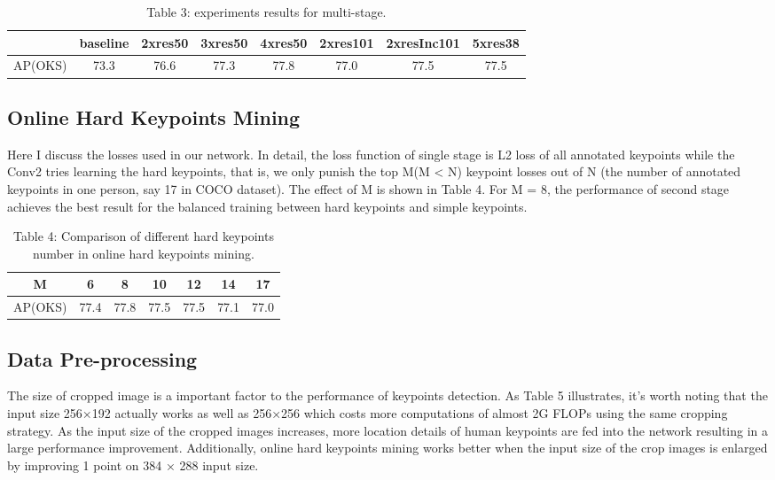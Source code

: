 \captionsetup[table]{labelformat=empty}
\begin{table}[!hbp]
  \centering
  \begin{tabular}{|c|c|c|c|c|c|c|c|}
  \hline
            & baseline & 2xres50 & 3xres50 & 4xres50 & 2xres101 & 2xresInc101 & 5xres38 \\
  \hline
  AP(OKS) & 73.3 & 76.6 & 77.3 & 77.8 & 77.0 & 77.5 & 77.5 \\
  \hline
  \end{tabular}
  \caption{Table 3: experiments results for multi-stage.}
\end{table}

\subsection{Online Hard Keypoints Mining}
Here I discuss the losses used in our network. In detail,
the loss function of single stage is L2 loss of all annotated
keypoints while the Conv2 tries learning the hard keypoints,
that is, we only punish the top M(M < N) keypoint
losses out of N (the number of annotated keypoints in one
person, say 17 in COCO dataset). The effect of M is shown
in Table 4. For M = 8, the performance of second stage
achieves the best result for the balanced training between
hard keypoints and simple keypoints.

\captionsetup[table]{labelformat=empty}
\begin{table}[!hbp]
  \centering
  \begin{tabular}{|c|c|c|c|c|c|c|}
  \hline
  M          & 6 & 8 & 10 & 12 & 14 & 17 \\
  \hline
  AP(OKS) & 77.4 & 77.8 & 77.5 & 77.5 & 77.1 & 77.0 \\
  \hline
  \end{tabular}
  \caption{Table 4: Comparison of different hard keypoints number in online hard keypoints mining.}
\end{table}

\subsection{Data Pre-processing}
The size of cropped image is a important factor to the performance
of keypoints detection. As Table 5 illustrates, it’s
worth noting that the input size 256×192 actually works as
well as 256×256 which costs more computations of almost
2G FLOPs using the same cropping strategy.
As the input size of the cropped images increases, more location details
of human keypoints are fed into the network resulting in a
large performance improvement.
Additionally, online hard
keypoints mining works better when the input size of the
crop images is enlarged by improving 1 point on 384 × 288
input size.

